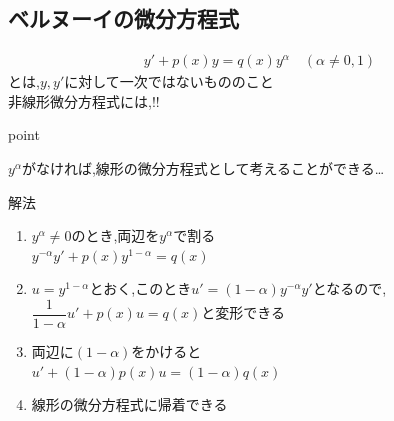 \documentclass[a4paper]{jsarticle}
\begin{document}
\subsection{ベルヌーイの微分方程式}
\begin{eqnarray*}
    y'+p\left(x\right)y=q\left(x\right)y^{\alpha}\quad\left(\alpha\neq 0,1\right)
\end{eqnarray*}
とは,$y,y'$に対して一次ではないもののこと\\
非線形微分方程式には,!!
\begin{itembox}[l]{point}
    \begin{center}
        $y^{\alpha}$がなければ,線形の微分方程式として考えることができる\dots
    \end{center}
\end{itembox}
\begin{itembox}[l]{解法}
    \begin{enumerate}[(1)]
        \item $y^{\alpha}\neq 0$のとき,両辺を$y^{\alpha}$で割る\\
              $y^{-\alpha} y'+p\left(x\right)y^{1-\alpha}=q\left(x\right)$
        \item $u=y^{1-\alpha}$とおく,このとき$u'=\left(1-\alpha\right)y^{-\alpha}y'$となるので,\\
              $\dfrac{1}{1-\alpha}u'+p\left(x\right)u=q\left(x\right)$と変形できる
        \item 両辺に$\left(1-\alpha\right)$をかけると\\
              $u'+\left(1-\alpha\right)p\left(x\right)u=\left(1-\alpha\right)q\left(x\right)$
        \item 線形の微分方程式に帰着できる
    \end{enumerate}
\end{itembox}
\end{document}
